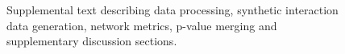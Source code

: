   \setcounter{figure}{0}
  \renewcommand{\figurename}{Text}
  \renewcommand{\thefigure}{S\arabic{figure}}
  \begin{figure}[H]
    \centering
    \caption{Supplemental text describing data processing, synthetic interaction data generation, network metrics, p-value merging and supplementary discussion sections.}
    \label{txt:text_s1}
  \end{figure}

